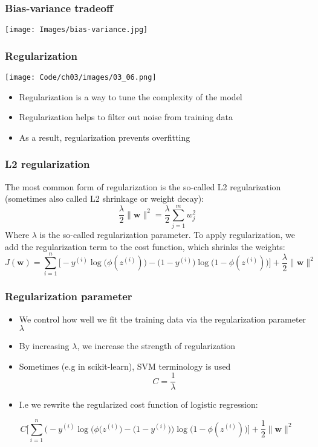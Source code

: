 \documentclass{beamer}
\begin{document}
\begin{frame}
  \frametitle{Bias-variance tradeoff}
  \texttt{[image: Images/bias-variance.jpg]}
\end{frame}

\begin{frame}
  \frametitle{Regularization}
  \texttt{[image: Code/ch03/images/03\_06.png]}
  \begin{itemize}
  \item Regularization is a way to tune the complexity of the model
  \item Regularization helps to filter out noise from training data
  \item As a result, regularization prevents overfitting
  \end{itemize}
\end{frame}

\begin{frame}
  \frametitle{L2 regularization}
  The most common form of regularization is the so-called L2 regularization (sometimes also called L2 shrinkage or weight decay):
  \[
  \frac{\lambda}{2} \lVert \mathbf{w} \rVert^2 = \frac{\lambda}{2} \sum_{j=1}^m w_{j}^{2}
  \]
  Where $\lambda$ is the so-called regularization parameter.
  To apply regularization, we add the regularization term to the cost function, which shrinks the weights:
  \[
  J(\mathbf{w}) = \sum_{i=1}^{n} \bigg[ - y^{(i)} \log \big(  \phi(z^{(i)})  \big)  - \big( 1 - y ^{(i)} \big)  \log \big( 1 - \phi(z^{(i)})   \big)   \bigg] + \frac{\lambda}{2} \lVert \mathbf{w}\rVert^2
  \]
\end{frame}

\begin{frame}
  \frametitle{Regularization parameter}
  \begin{itemize}
  \item We control how well we fit the training data via the regularization parameter $\lambda$
  \item By increasing $\lambda$, we increase the strength of regularization
  \item Sometimes (e.g in scikit-learn), SVM terminology is used
    \[
    C = \frac{1}{\lambda}
    \]
  \item I.e we rewrite the regularized cost function of logistic regression:
  \end{itemize}
  \[
  C \Bigg[  \sum_{i=1}^{n} \Big(   -y^{(i)} \log \big( \phi(z^{(i)} \big) - \big(  1 - y^{(i)} \big)    \Big) \log \bigg( 1 - \phi(z^{(i)}) \bigg)         \Bigg] + \frac{1}{2} \lVert \mathbf{w} \rVert^2
  \]
\end{frame}
\end{document}
